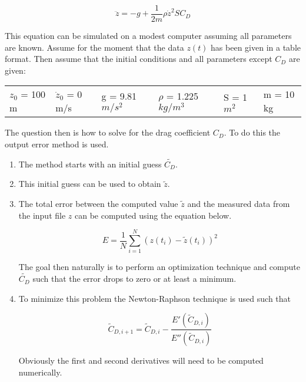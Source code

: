 \begin{enumerate}
\begin{equation}\nonumber
\ddot{z} = -g + \frac{1}{2m}\rho\dot{z}^2SC_D
\end{equation}

This equation can be simulated on a modest computer assuming all
parameters are known. Assume for the moment that the data $z(t)$ has
been given in a table format. Then assume that the initial conditions
and all parameters except $C_D$ are given:
\ \\

\begin{center}\begin{tabular}{l l l l l l}
$z_0$ = 100 m & $\dot{z}_0$ = 0 m/s & g = 9.81 $m/s^2$ & $\rho$ =
    1.225 $kg/m^3$ & S = 1 $m^2$ & m = 10 kg
\end{tabular}\end{center}

The question then is how to solve for the drag coefficient $C_D$. To
do this the output error method is used. 

\begin{enumerate}

\item The method starts with an initial guess $\tilde{C_D}$.

\item This initial guess can be used to obtain $\tilde{z}$.

\item The total error between the computed value $\tilde{z}$ and the
  measured data from the input file $z$ can be computed using the
  equation below.

  \begin{equation}
    E = \frac{1}N\sum\limits_{i=1}^N (z(t_i)-\tilde{z}(t_i))^2
  \end{equation}
  
  The goal then naturally is to perform an optimization technique and
  compute $\tilde{C_D}$ such that the error drops to zero or at least
  a minimum.

 \item To minimize this problem the Newton-Raphson technique is used
   such that

   \begin{equation}
     \tilde{C}_{D,i+1} = \tilde{C}_{D,i} - \frac{E'(\tilde{C}_{D,i})}{E''(\tilde{C}_{D,i})}
   \end{equation}

   Obviously the first and second derivatives will need to be computed numerically.


\end{enumerate}
\end{enumerate}
